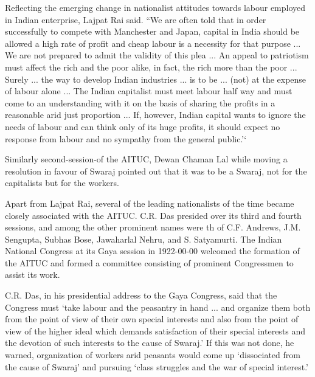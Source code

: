 \begin{multicols}{2}
Reflecting the emerging change in nationalist attitudes towards labour employed in Indian enterprise, Lajpat Rai said. ``We are often told that in order successfully to compete with Manchester and Japan, capital in India should be allowed a high rate of profit and cheap labour is a necessity for that purpose ... We are not prepared to admit the validity of this plea ... An appeal to patriotism must affect the rich and the poor alike, in fact, the rich more than the poor ... Surely ... the way to develop Indian industries ... is to be ... (not) at the expense of labour alone ... The Indian capitalist must meet labour half way and must come to an understanding with it on the basis of sharing the profits in a reasonable arid just proportion ... If, however, Indian capital wants to ignore the needs of labour and can think only of its huge profits, it should expect no response from labour and no sympathy from the general public.'`

Similarly second-session-of the AITUC, Dewan Chaman Lal while moving a resolution in favour of Swaraj pointed out that it was to be a Swaraj, not for the capitalists but for the workers.

Apart from Lajpat Rai, several of the leading nationalists of the time became closely associated with the AITUC. C.R. Das presided over its third and fourth sessions, and among the other prominent names were th of C.F. Andrews, J.M. Sengupta, Subhas Bose, Jawaharlal Nehru, and S. Satyamurti. The Indian National Congress at its Gaya session in 1922-00-00 welcomed the formation of the AITUC and formed a committee consisting of prominent Congressmen to assist its work.

C.R. Das, in his presidential address to the Gaya Congress, said that the Congress must `take labour and the peasantry in hand ... and organize them both from the point of view of their own special interests and also from the point of view of the higher ideal which demands satisfaction of their special interests and the devotion of such interests to the cause of Swaraj.' If this was not done, he warned, organization of workers arid peasants would come up `dissociated from the cause of Swaraj' and pursuing `class struggles and the war of special interest.'


\end{multicols}
